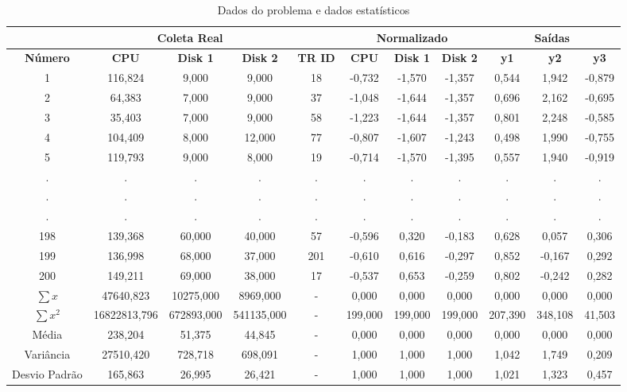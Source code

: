 \documentclass[11pt,a4paper,openany,oneside]{abntex2}
\begin{document}
	\begin{table}[H]
		\caption{Dados do problema e dados estatísticos}
		\centering
		\begin{tabular}{|c|c|c|c|c|c|c|c|c|c|c|}
			\hline
			\textbf{} & \multicolumn{ 3}{c|}{\textbf{Coleta Real}} & \textbf{} & \multicolumn{ 3}{c|}{\textbf{Normalizado}} & \multicolumn{ 3}{c|}{\textbf{Saídas}} \\ \hline
			\textbf{Número} & \textbf{CPU} & \textbf{Disk 1} & \textbf{Disk 2} & \textbf{TR ID } & \textbf{CPU} & \textbf{Disk 1} & \textbf{Disk 2} & \textbf{y1} & \textbf{y2} & \textbf{y3} \\ \hline
			1 & 116,824 & 9,000 & 9,000 & 18 & -0,732 & -1,570 & -1,357 & 0,544 & 1,942 & -0,879 \\ \hline
			2 & 64,383 & 7,000 & 9,000 & 37 & -1,048 & -1,644 & -1,357 & 0,696 & 2,162 & -0,695 \\ \hline
			3 & 35,403 & 7,000 & 9,000 & 58 & -1,223 & -1,644 & -1,357 & 0,801 & 2,248 & -0,585 \\ \hline
			4 & 104,409 & 8,000 & 12,000 & 77 & -0,807 & -1,607 & -1,243 & 0,498 & 1,990 & -0,755 \\ \hline
			5 & 119,793 & 9,000 & 8,000 & 19 & -0,714 & -1,570 & -1,395 & 0,557 & 1,940 & -0,919 \\ \hline
			. & . & . & . & . & . & . & . & . & . & . \\ \hline
			. & . & . & . & . & . & . & . & . & . & . \\ \hline
			. & . & . & . & . & . & . & . & . & . & . \\ \hline
			198 & 139,368 & 60,000 & 40,000 & 57 & -0,596 & 0,320 & -0,183 & 0,628 & 0,057 & 0,306 \\ \hline
			199 & 136,998 & 68,000 & 37,000 & 201 & -0,610 & 0,616 & -0,297 & 0,852 & -0,167 & 0,292 \\ \hline
			200 & 149,211 & 69,000 & 38,000 & 17 & -0,537 & 0,653 & -0,259 & 0,802 & -0,242 & 0,282 \\ \hline
			$\sum x$ & 47640,823 & 10275,000 & 8969,000 & - & 0,000 &0,000& 0,000 & 0,000 & 0,000 & 0,000 \\ \hline
			$\sum x^{2}$    & 16822813,796 & 672893,000 & 541135,000 & - & 199,000 & 199,000 & 199,000 & 207,390 & 348,108 & 41,503 \\ \hline
			Média & 238,204 & 51,375 & 44,845 & - & 0,000 & 0,000 & 0,000 & 0,000 & 0,000 & 0,000 \\ \hline
			Variância & 27510,420 & 728,718 & 698,091 & - & 1,000 & 1,000 & 1,000 & 1,042 & 1,749 & 0,209 \\ \hline
			Desvio Padrão & 165,863 & 26,995 & 26,421 & - & 1,000 & 1,000 & 1,000 & 1,021 & 1,323 & 0,457 \\ \hline
		\end{tabular}
		\label{tab:dados}
	\end{table}
\end{document}
